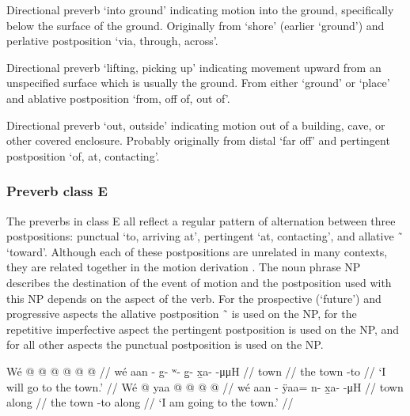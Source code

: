 \begin{morphdesc}
\item[\X{ÿanax̱=}]
	Directional preverb ‘into ground’ indicating motion into the ground, specifically
		below the surface of the ground.
	Originally from  ‘shore’ (earlier ‘ground’)
		and perlative postposition  ‘via, through, across’.

\item[\X{yatx̱=}]
\item[\X{yetx̱=}] \removeitemvspace
\item[\X{yedax̱=}] \removeitemvspace
	Directional preverb ‘lifting, picking up’ indicating movement upward
		from an unspecified surface which is usually the ground.
	From either  ‘ground’ or  ‘place’
		and ablative postposition  ‘from, off of, out of’.

\item[\X{yux̱=}]
	Directional preverb ‘out, outside’ indicating motion out of a building, cave,
		or other covered enclosure.
	Probably originally from distal  ‘far off’
		and pertingent postposition  ‘of, at, contacting’.
\end{morphdesc}

\subsubsection{Preverb class E}\label{sec:inventory-preverb-E}

The preverbs in class E all reflect a regular pattern of alternation between three postpositions:
	punctual  ‘to, arriving at’,
	pertingent  ‘at, contacting’,
	and allative  \~\  ‘toward’.
Although each of these postpositions are unrelated in many contexts,
	they are related together in the motion derivation
	.
The noun phrase NP describes the destination of the event of motion
	and the postposition used with this NP depends on the aspect of the verb.
For the prospective (‘future’) and progressive aspects the allative postposition  \~\ 
	is used on the NP,
	for the repetitive imperfective aspect the pertingent postposition  is used on the NP,
	and for all other aspects the punctual postposition  is used on the NP.

\pex\label{ex:inventory-preverb-F-prospprog}%
\a\label{ex:inventory-preverb-F-prospprog-prosp}%
\begingl
	\gla	Wé  @ {}  @ {} @ {} @ {} @ {} @ {} //
	\glb	wé aan - g- ʷ- g̱- x̱a-  -μμH //
	\glc	{} town \· \· \· \· \·  \· //
	\gld	the town -to  {} {} {} {} {} //
	\glft	‘I will go to the town.’
		//
\endgl
\a\label{ex:inventory-preverb-F-prospprog-prog}%
\begingl
	\gla	Wé  @ {} yaa @  @ {} @ {} @ {} //
	\glb	wé aan - ÿaa= n- x̱a-  -μH //
	\glc	{} town \· along\· \· \·  \· //
	\gld	the town -to along\·  {} {} {} //
	\glft	‘I am going to the town.’
		//
\endgl
\xe

